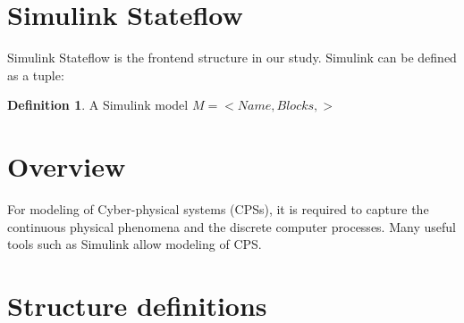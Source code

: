 \documentclass[twoside,a4paper,12pt]{article}
\theoremstyle{definition}
\newtheorem{definition}{Definition}
\begin{document}
\section{Simulink Stateflow}
Simulink Stateflow is the frontend structure in our study. Simulink can be defined as a tuple:

\begin{definition}
	A Simulink model $M = <Name,  Blocks, >$
	
\end{definition}


\section{Overview}
For modeling of Cyber-physical systems (CPSs), it is required to capture the continuous physical phenomena and the discrete computer processes. Many useful tools such as Simulink allow modeling of CPS.

\section{Structure definitions}
\end{document}
